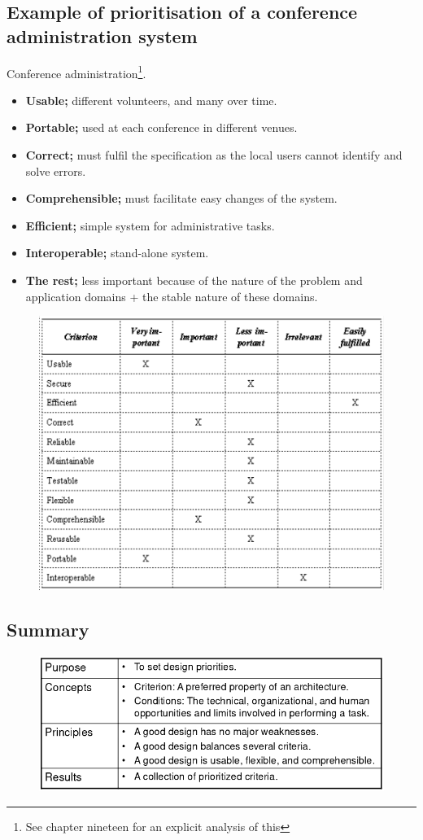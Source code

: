 \subsection{Example of prioritisation of a conference administration system}
Conference administration\footnote{See chapter nineteen for an explicit analysis of this}.

\begin{itemize}
    \item \textbf{Usable;} different volunteers, and many over time.
    \item \textbf{Portable;} used at each conference in different venues. 
    \item \textbf{Correct;} must fulfil the specification as the local users cannot identify and solve errors. 
    \item \textbf{Comprehensible;} must facilitate easy changes of the system. 
    \item \textbf{Efficient;} simple system for administrative tasks.
    \item \textbf{Interoperable;} stand-alone system. 
    \item \textbf{The rest;} less important because of the nature of the problem and application domains + the stable nature of these domains.
\end{itemize}

\begin{figure}[H]
    \centering
    \includegraphics[scale=1]{figures/criteriaprioritize.png}
\end{figure}

\subsection{Summary}
\begin{figure}[H]
    \centering
    \includegraphics[width=.7\textwidth]{figures/criteriasummary.png}
\end{figure}

